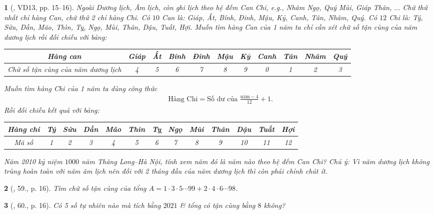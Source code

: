 \documentclass{article}
\newtheorem{baitoan}{}
\begin{document}
\begin{baitoan}[\cite{Tuyen_Toan_6}, VD13, pp. 15--16]
	Ngoài Dương lịch, Âm lịch, còn ghi lịch theo hệ đếm Can Chi, e.g., Nhâm Ngọ, Quý Mùi, Giáp Thân, $\ldots$ Chữ thứ nhất chỉ hàng Can, chữ thứ 2 chỉ hàng Chi. Có $10$ Can là: Giáp, Ất, Bính, Đinh, Mậu, Kỷ, Canh, Tân, Nhâm, Quý. Có $12$ Chi là: Tý, Sửu, Dần, Mão, Thìn, Tỵ, Ngọ, Mùi, Thân, Dậu, Tuất, Hợi. Muốn tìm hàng Can của 1 năm ta chỉ cần xét chữ số tận cùng của năm dương lịch rồi đối chiếu với bảng:
	\begin{table}[H]
		\centering
		\begin{tabular}{|c|c|c|c|c|c|c|c|c|c|c|}
			\hline
			Hàng can & Giáp & Ất & Bính & Đinh & Mậu & Kỷ & Canh & Tân & Nhâm & Quý \\
			\hline
			Chữ số tận cùng của năm dương lịch & 4 & 5 & 6 & 7 & 8 & 9 & 0 & 1 & 2 & 3 \\
			\hline
		\end{tabular}
	\end{table}
	\noindent Muốn tìm hàng Chi của 1 năm ta dùng công thức
	\begin{align*}
		\mbox{Hàng Chi} = \mbox{Số dư của }\frac{\mbox{năm} - 4}{12} + 1.
	\end{align*}
	Rồi đối chiếu kết quả với bảng:
	\begin{table}[H]
		\centering
		\begin{tabular}{|c|c|c|c|c|c|c|c|c|c|c|c|c|}
			\hline
			Hàng chi & Tý & Sửu & Dần & Mão & Thìn & Tỵ & Ngọ & Mùi & Thân & Dậu & Tuất & Hợi \\
			\hline
			Mã số & 1 & 2 & 3 & 4 & 5 & 6 & 7 & 8 & 9 & 10 & 11 & 12 \\
			\hline
		\end{tabular}
	\end{table}
	\noindent Năm 2010 kỷ niệm $1000$ năm Thăng Long--Hà Nội, tính xem năm đó là năm nào theo hệ đếm Can Chi? Chú ý: Vì năm dương lịch không trùng hoàn toàn với năm âm lịch nên đối với 2 tháng đầu của năm dương lịch thì còn phải chỉnh chút ít.
\end{baitoan}

\begin{baitoan}[\cite{Tuyen_Toan_6}, 59., p. 16]
	Tìm chữ số tận cùng của tổng $A = 1\cdot3\cdot5\cdots99 + 2\cdot4\cdot6\cdots98$.
\end{baitoan}

\begin{baitoan}[\cite{Tuyen_Toan_6}, 60., p. 16]
	Có 5 số tự nhiên nào mà tích bằng $2021$ \& tổng có tận cùng bằng $8$ không?
\end{baitoan}
\end{document}
